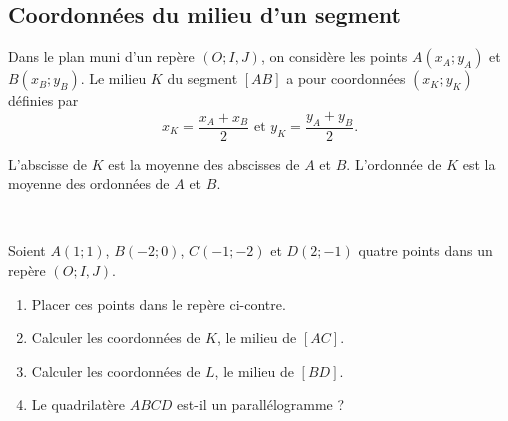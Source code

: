 \documentclass[11pt]{article}
\begin{document}
\subsection{Coordonnées du milieu d'un segment}
\begin{prop}
  Dans le plan muni d'un repère $(O; I, J)$, on considère les points $A(x_A;
  y_A)$ et $B(x_B; y_B)$. Le milieu $K$ du segment $\left[ AB \right]$ a pour
  coordonnées $(x_K; y_K)$ définies par
  \[
    x_K = \frac{x_A+x_B}{2}\text{ et }y_K = \frac{y_A+y_B}{2}.
  \]
\end{prop}
\begin{rmq}
  L'abscisse de $K$ est la moyenne des abscisses de $A$ et $B$. L'ordonnée de
  $K$ est la moyenne des ordonnées de $A$ et $B$.
\end{rmq}
\begin{app}~\\[-5mm]
  \begin{minipage}{.6\textwidth}
  Soient $A(1; 1)$, $B(-2; 0)$, $C(-1; -2)$ et $D(2; -1)$ quatre points dans un
  repère $(O; I, J)$.
  \begin{enumerate}
    \item Placer ces points dans le repère ci-contre.
    \item Calculer les coordonnées de $K$, le milieu de $\left[ AC \right]$.
    \item Calculer les coordonnées de $L$, le milieu de $\left[ BD \right]$.
    \item Le quadrilatère $ABCD$ est-il un parallélogramme ?
  \end{enumerate}
\end{minipage}
  \begin{minipage}{.4\textwidth}
    \begin{center}
    \end{center}
  \end{minipage}
\end{app}
\end{document}
